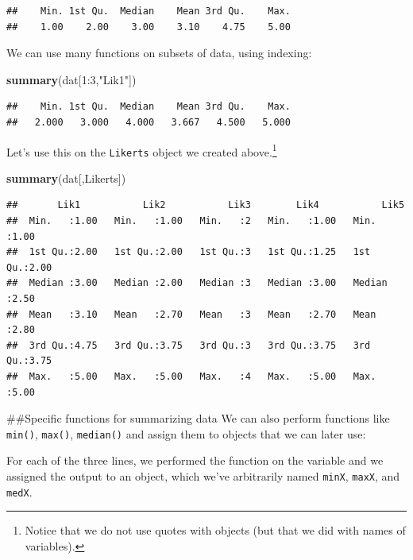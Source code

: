 \documentclass[]{tufte-handout}
\newenvironment{Shaded}{}{}
\newcommand{\DecValTok}[1]{\textcolor[rgb]{0.25,0.63,0.44}{#1}}
\newcommand{\KeywordTok}[1]{\textcolor[rgb]{0.00,0.44,0.13}{\textbf{#1}}}
\newcommand{\NormalTok}[1]{#1}
\newcommand{\OperatorTok}[1]{\textcolor[rgb]{0.40,0.40,0.40}{#1}}
\newcommand{\StringTok}[1]{\textcolor[rgb]{0.25,0.44,0.63}{#1}}
\begin{document}
\begin{verbatim}
##    Min. 1st Qu.  Median    Mean 3rd Qu.    Max. 
##    1.00    2.00    3.00    3.10    4.75    5.00
\end{verbatim}

We can use many functions on subsets of data, using indexing:

\begin{Shaded}
\begin{Highlighting}[]
\KeywordTok{summary}\NormalTok{(dat[}\DecValTok{1}\OperatorTok{:}\DecValTok{3}\NormalTok{,}\StringTok{"Lik1"}\NormalTok{])}
\end{Highlighting}
\end{Shaded}

\begin{verbatim}
##    Min. 1st Qu.  Median    Mean 3rd Qu.    Max. 
##   2.000   3.000   4.000   3.667   4.500   5.000
\end{verbatim}

Let's use this on the \texttt{Likerts} object we created
above.\footnote{Notice that we do not use quotes with objects (but that
  we did with names of variables).}

\begin{Shaded}
\begin{Highlighting}[]
\KeywordTok{summary}\NormalTok{(dat[,Likerts])}
\end{Highlighting}
\end{Shaded}

\begin{verbatim}
##       Lik1           Lik2           Lik3        Lik4           Lik5     
##  Min.   :1.00   Min.   :1.00   Min.   :2   Min.   :1.00   Min.   :1.00  
##  1st Qu.:2.00   1st Qu.:2.00   1st Qu.:3   1st Qu.:1.25   1st Qu.:2.00  
##  Median :3.00   Median :2.00   Median :3   Median :3.00   Median :2.50  
##  Mean   :3.10   Mean   :2.70   Mean   :3   Mean   :2.70   Mean   :2.80  
##  3rd Qu.:4.75   3rd Qu.:3.75   3rd Qu.:3   3rd Qu.:3.75   3rd Qu.:3.75  
##  Max.   :5.00   Max.   :5.00   Max.   :4   Max.   :5.00   Max.   :5.00
\end{verbatim}

\#\#Specific functions for summarizing data We can also perform
functions like \texttt{min()}, \texttt{max()}, \texttt{median()} and
assign them to objects that we can later use:

\begin{marginfigure}
For each of the three lines, we performed the function on the variable
and we assigned the output to an object, which we've arbitrarily named
\texttt{minX}, \texttt{maxX}, and \texttt{medX}.
\end{marginfigure}
\end{document}
